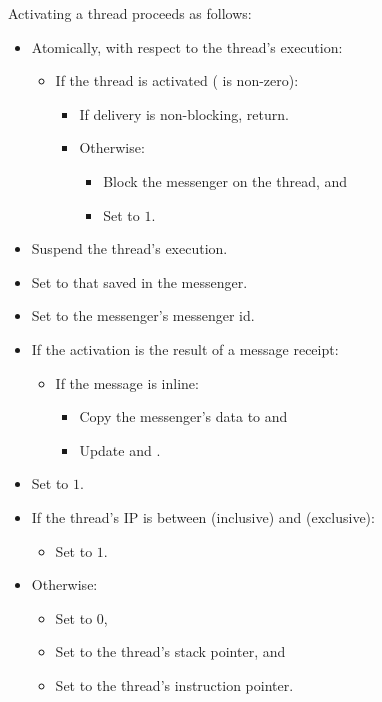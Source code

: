 Activating a thread proceeds as follows:

\begin{itemize}
\item Atomically, with respect to the thread's execution:
  \begin{itemize}
  \item If the thread is activated ( is non-zero):
    \begin{itemize}
    \item If delivery is non-blocking, return.
    \item Otherwise:
      \begin{itemize}
      \item Block the messenger on the thread, and
      \item Set  to $1$.
      \end{itemize}
    \end{itemize}
  \end{itemize}

\item Suspend the thread's execution.

\item Set  to that saved in the messenger.
\item Set  to the messenger's messenger id.

\item If the activation is the result of a message receipt:
  \begin{itemize}
  \item If the message is inline:
    \begin{itemize}
    \item Copy the messenger's data to  and
    \item Update  and .
    \end{itemize}
  \end{itemize}

\item Set  to $1$.

\item If the thread's IP is between 
  (inclusive) and  (exclusive):
  \begin{itemize}
  \item Set  to $1$.
  \end{itemize}
\item Otherwise:
  \begin{itemize}
  \item Set  to $0$,
  \item Set  to the thread's stack pointer, and
  \item Set  to the thread's instruction pointer.
  \end{itemize}


\end{itemize}
